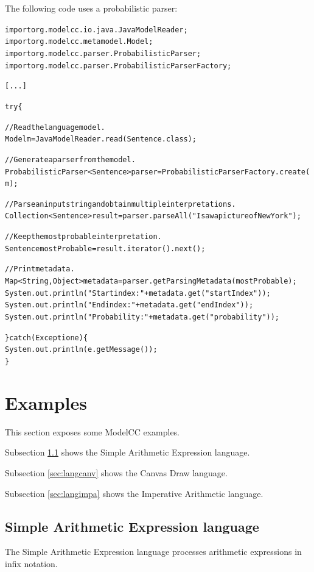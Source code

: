 \documentclass[a4paper,twoside,onecolumn]{article}
\newenvironment{colframe}{%
  \begin{Sbox} 
    \begin{minipage}{.8\columnwidth} 
}{%

  \end{minipage} 
  \end{Sbox} 
  \begin{center} 
    \fcolorbox{black}{MyGray}{\TheSbox} 
  \end{center} 
}
\begin{document}
The following code uses a probabilistic parser:

\begin{colframe}
\begin{alltt}
import org.modelcc.io.java.JavaModelReader;
import org.modelcc.metamodel.Model;
import org.modelcc.parser.ProbabilisticParser;
import org.modelcc.parser.ProbabilisticParserFactory;

[...]

try \{

  // Read the language model.
  Model m = JavaModelReader.read(Sentence.class);

  // Generate a parser from the model.
  ProbabilisticParser<Sentence> parser = ProbabilisticParserFactory.create(m);

  // Parse an input string and obtain multiple interpretations.
  Collection<Sentence> result = parser.parseAll("I saw a picture of New York");

  // Keep the most probable interpretation.
  Sentence mostProbable = result.iterator().next();

  // Print metadata.
  Map<String,Object> metadata = parser.getParsingMetadata(mostProbable); 
  System.out.println("Start index: "+metadata.get("startIndex"));
  System.out.println("End index: "+metadata.get("endIndex"));
  System.out.println("Probability: "+metadata.get("probability"));

\} catch (Exception e) \{
  System.out.println(e.getMessage());
\}
\end{alltt}
\end{colframe}


\section{Examples} \label{sec:examples}

This section exposes some ModelCC examples.

Subsection \ref{sec:langsae} shows the Simple Arithmetic Expression language.

Subsection \ref{sec:langcanv} shows the Canvas Draw language.

Subsection \ref{sec:langimpa} shows the Imperative Arithmetic language.

\subsection{Simple Arithmetic Expression language} \label{sec:langsae}

The Simple Arithmetic Expression language processes arithmetic expressions in infix notation.
\end{document}
